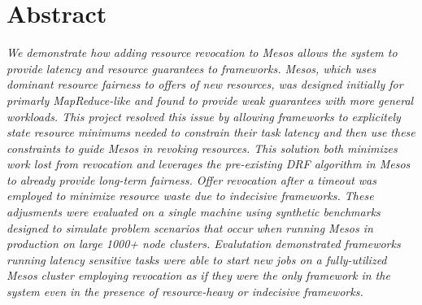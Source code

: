 \section{Abstract}
\textit{We demonstrate how adding resource revocation to Mesos allows the
system to provide latency and resource guarantees to frameworks. Mesos, which
uses dominant resource fairness to offers of new resources, was designed
initially for primarly MapReduce-like and found to provide weak guarantees with
more general workloads. This project resolved this issue by allowing frameworks
to explicitely state resource minimums needed to constrain their task latency
and then use these constraints to guide Mesos in revoking resources.  This
solution both minimizes work lost from revocation and leverages the
pre-existing DRF algorithm in Mesos to already provide long-term fairness.
Offer revocation after a timeout was employed to minimize resource waste due to
indecisive frameworks. These adjusments were evaluated on a single machine
using synthetic benchmarks designed to simulate problem scenarios that occur
when running Mesos in production on large 1000+ node clusters. Evalutation
demonstrated frameworks running latency sensitive tasks were able to start new
jobs on a fully-utilized Mesos cluster employing revocation as if they were the
only framework in the system even in the presence of resource-heavy or
indecisive frameworks.}
